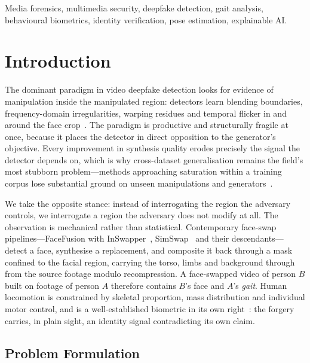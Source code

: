 \documentclass[conference]{IEEEtran}
\begin{document}
\begin{IEEEkeywords}
Media forensics, multimedia security, deepfake detection, gait analysis,
behavioural biometrics, identity verification, pose estimation, explainable AI.
\end{IEEEkeywords}

\section{Introduction}
\label{sec:intro}

The dominant paradigm in video deepfake detection looks for evidence of
manipulation inside the manipulated region: detectors learn blending
boundaries, frequency-domain irregularities, warping residues and temporal
flicker in and around the face crop~\cite{recce,multi_attn,ftcn,altfreezing,%
fsbi}. The paradigm is productive and structurally fragile at once, because it
places the detector in direct opposition to the generator's objective. Every
improvement in synthesis quality erodes precisely the signal the detector
depends on, which is why cross-dataset generalisation remains the field's most
stubborn problem---methods approaching saturation within a training corpus lose
substantial ground on unseen manipulations and
generators~\cite{recce,ftcn,deepfake_eval}.

We take the opposite stance: instead of interrogating the region the adversary
controls, we interrogate a region the adversary does not modify at all. The
observation is mechanical rather than statistical. Contemporary face-swap
pipelines---FaceFusion with InSwapper~\cite{facefusion,insightface},
SimSwap~\cite{simswap} and their descendants---detect a face, synthesise a
replacement, and composite it back through a mask confined to the facial
region, carrying the torso, limbs and background through from the source
footage modulo recompression. A face-swapped video of person $B$ built on
footage of person $A$ therefore contains $B$'s face and $A$'s \emph{gait}. Human
locomotion is constrained by skeletal proportion, mass distribution and
individual motor control, and is a well-established biometric in its own
right~\cite{gaitgraph,gaitpt,gaitformer,perry_gait,winter_biomech}: the forgery
carries, in plain sight, an identity signal contradicting its own claim.

\subsection{Problem Formulation}
\end{document}
